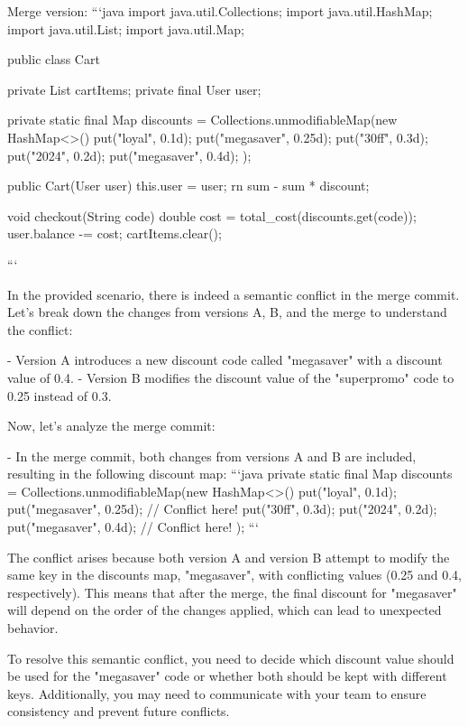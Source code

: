 \begin{prompt}
{  Merge version:
  ```java
  import java.util.Collections;
  import java.util.HashMap;
  import java.util.List;
  import java.util.Map;
  
  public class Cart {
      private List cartItems;
      private final User user;
  
      private static final Map discounts = Collections.unmodifiableMap(new HashMap<>() {{
          put("loyal", 0.1d);
          put("megasaver", 0.25d);
          put("30ff", 0.3d);
          put("2024", 0.2d);
          put("megasaver", 0.4d);
      }});
  
  
      public Cart(User user) {
          this.user = user;
      }
  rn sum - sum * discount;
      }
      void checkout(String code) {
          double cost = total_cost(discounts.get(code));
          user.balance -= cost;
          cartItems.clear();
      }
  }
  ```
\end{prompt}

\begin{answer}
  In the provided scenario, there is indeed a semantic conflict in the merge commit. Let's break down the changes from versions A, B, and the merge to understand the conflict:

  - Version A introduces a new discount code called "megasaver" with a discount value of 0.4.
  - Version B modifies the discount value of the "superpromo" code to 0.25 instead of 0.3.
  
  Now, let's analyze the merge commit:
  
  - In the merge commit, both changes from versions A and B are included, resulting in the following discount map:
  ```java
  private static final Map discounts = Collections.unmodifiableMap(new HashMap<>() {{
      put("loyal", 0.1d);
      put("megasaver", 0.25d); // Conflict here!
      put("30ff", 0.3d);
      put("2024", 0.2d);
      put("megasaver", 0.4d); // Conflict here!
  }});
  ```
  
  The conflict arises because both version A and version B attempt to modify the same key in the discounts map, "megasaver", with conflicting values (0.25 and 0.4, respectively). This means that after the merge, the final discount for "megasaver" will depend on the order of the changes applied, which can lead to unexpected behavior.
  
  To resolve this semantic conflict, you need to decide which discount value should be used for the "megasaver" code or whether both should be kept with different keys. Additionally, you may need to communicate with your team to ensure consistency and prevent future conflicts.
\end{answer}

